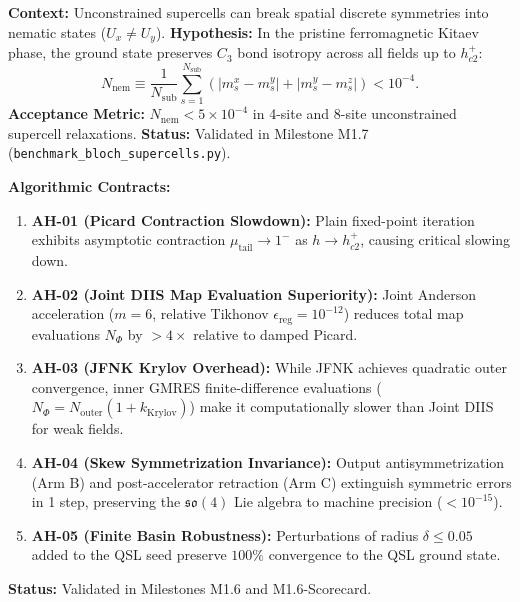\begin{contract}
\label{con:ph05_no_nematicity}
\textbf{Context:} Unconstrained supercells can break spatial discrete symmetries into nematic states ($U_x \neq U_y$).
\textbf{Hypothesis:} In the pristine ferromagnetic Kitaev phase, the ground state preserves $C_3$ bond isotropy across all fields up to $h_{c2}^+$:
\begin{equation}
N_{\mathrm{nem}} \equiv \frac{1}{N_{\mathrm{sub}}} \sum_{s=1}^{N_{\mathrm{sub}}} \left( |m_s^x - m_s^y| + |m_s^y - m_s^z| \right) < 10^{-4}.
\end{equation}
\textbf{Acceptance Metric:} $N_{\mathrm{nem}} < 5 \times 10^{-4}$ in 4-site and 8-site unconstrained supercell relaxations.
\textbf{Status:} Validated in Milestone M1.7 (\texttt{benchmark\_bloch\_supercells.py}).
\end{contract}

\begin{contract}
\label{con:ah01_solver_complexity}
\textbf{Algorithmic Contracts:}
\begin{enumerate}
\item \textbf{AH-01 (Picard Contraction Slowdown):} Plain fixed-point iteration exhibits asymptotic contraction $\mu_{\mathrm{tail}} \to 1^-$ as $h \to h_{c2}^+$, causing critical slowing down.
\item \textbf{AH-02 (Joint DIIS Map Evaluation Superiority):} Joint Anderson acceleration ($m=6$, relative Tikhonov $\epsilon_{\mathrm{reg}} = 10^{-12}$) reduces total map evaluations $N_\Phi$ by $> 4\times$ relative to damped Picard.
\item \textbf{AH-03 (JFNK Krylov Overhead):} While JFNK achieves quadratic outer convergence, inner GMRES finite-difference evaluations ($N_\Phi = N_{\mathrm{outer}}(1 + k_{\mathrm{Krylov}})$) make it computationally slower than Joint DIIS for weak fields.
\item \textbf{AH-04 (Skew Symmetrization Invariance):} Output antisymmetrization (Arm B) and post-accelerator retraction (Arm C) extinguish symmetric errors in 1 step, preserving the $\mathfrak{so}(4)$ Lie algebra to machine precision ($< 10^{-15}$).
\item \textbf{AH-05 (Finite Basin Robustness):} Perturbations of radius $\delta \le 0.05$ added to the QSL seed preserve $100\%$ convergence to the QSL ground state.
\end{enumerate}
\textbf{Status:} Validated in Milestones M1.6 and M1.6-Scorecard.
\end{contract}

